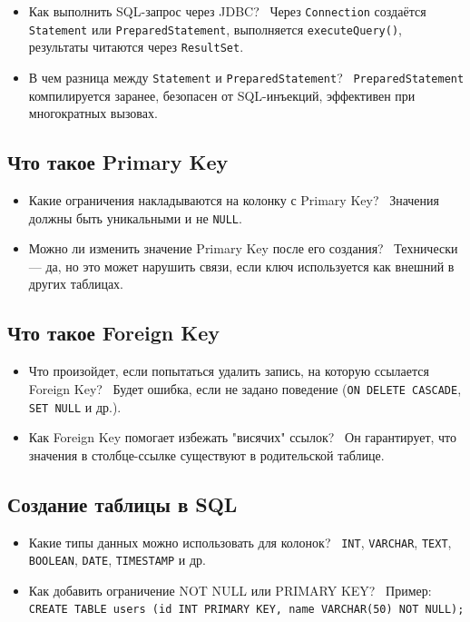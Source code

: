\documentclass[a4paper,14pt]{article}
\begin{document}
\begin{itemize}
\item Как выполнить SQL-запрос через JDBC? \
Через \texttt{Connection} создаётся \texttt{Statement} или \texttt{PreparedStatement}, выполняется \texttt{executeQuery()}, результаты читаются через \texttt{ResultSet}.

\item В чем разница между \texttt{Statement} и \texttt{PreparedStatement}? \
\texttt{PreparedStatement} компилируется заранее, безопасен от SQL-инъекций, эффективен при многократных вызовах.
\end{itemize}

\subsection{Что такое Primary Key}

\begin{itemize}
\item Какие ограничения накладываются на колонку с Primary Key? \
Значения должны быть уникальными и не \texttt{NULL}.

\item Можно ли изменить значение Primary Key после его создания? \
Технически — да, но это может нарушить связи, если ключ используется как внешний в других таблицах.
\end{itemize}

\subsection{Что такое Foreign Key}

\begin{itemize}
\item Что произойдет, если попытаться удалить запись, на которую ссылается Foreign Key? \
Будет ошибка, если не задано поведение (\texttt{ON DELETE CASCADE}, \texttt{SET NULL} и др.).

\item Как Foreign Key помогает избежать "висячих" ссылок? \
Он гарантирует, что значения в столбце-ссылке существуют в родительской таблице.
\end{itemize}

\subsection{Создание таблицы в SQL}

\begin{itemize}
\item Какие типы данных можно использовать для колонок? \
\texttt{INT}, \texttt{VARCHAR}, \texttt{TEXT}, \texttt{BOOLEAN}, \texttt{DATE}, \texttt{TIMESTAMP} и др.

\item Как добавить ограничение NOT NULL или PRIMARY KEY? \
Пример: \texttt{CREATE TABLE users (id INT PRIMARY KEY, name VARCHAR(50) NOT NULL);}
\end{itemize}
\end{document}
